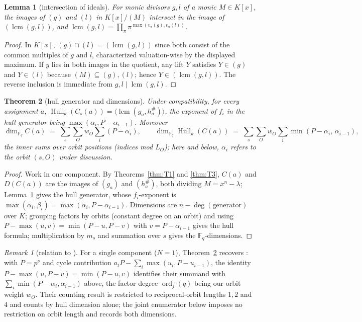 \documentclass[11pt]{article}
\newtheorem{theorem}{Theorem}[section]
\newtheorem{lemma}[theorem]{Lemma}
\theoremstyle{definition}
\theoremstyle{remark}
\newtheorem*{remark}{Remark}
\newcommand{\Fq}{\mathbb{F}_q}
\newcommand{\Hull}{\operatorname{Hull}}
\newcommand{\lcm}{\operatorname{lcm}}
\begin{document}
\begin{lemma}[intersection of ideals]\label{lem:lcm}
For monic divisors \(g, l\) of a monic \(M \in K[x]\), the images of
\((g)\) and \((l)\) in \(K[x]/(M)\) intersect in the image of
\((\lcm(g,l))\), and
\(\lcm(g,l) = \prod_{\pi} \pi^{\max(v_\pi(g), v_\pi(l))}\).
\end{lemma}

\begin{proof}
In \(K[x]\), \((g) \cap (l) = (\lcm(g,l))\) since both consist of the
common multiples of \(g\) and \(l\), characterized valuation-wise by the
displayed maximum. If \(y\) lies in both images in the quotient, any
lift \(Y\) satisfies \(Y \in (g)\) and \(Y \in (l)\) because
\((M) \subseteq (g), (l)\); hence \(Y \in (\lcm(g,l))\). The reverse
inclusion is immediate from \(g, l \mid \lcm(g,l)\).
\end{proof}

\begin{theorem}[hull generator and dimensions]\label{thm:T4}
Under compatibility, for every assignment \(a\),
\(\Hull_k(C_s(a)) = \langle \lcm(g_a, h_a^{\#}) \rangle\), the exponent
of \(f_i\) in the hull generator being \(\max(\alpha_i, P-\alpha_{i-1})\).
Moreover
\[
\dim_{\Fq} C(a) \;=\; \sum_{s} \sum_{O} w_O \sum_{i} (P - \alpha_i),
\qquad
\dim_{\Fq} \Hull_k(C(a)) \;=\; \sum_{s} \sum_{O} w_O \sum_i
\min(P-\alpha_i,\, \alpha_{i-1}),
\]
the inner sums over orbit positions (indices mod \(L_O\)); here and
below, \(\alpha_i\) refers to the orbit \((s,O)\) under discussion.
\end{theorem}

\begin{proof}
Work in one component. By Theorems~\ref{thm:T1} and \ref{thm:T3},
\(C(a)\) and \(D(C(a))\) are the images of \((g_a)\) and
\((h_a^{\#})\), both dividing \(M = x^n-\lambda\); Lemma~\ref{lem:lcm}
gives the hull generator, whose \(f_i\)-exponent is
\(\max(\alpha_i, \beta_i) = \max(\alpha_i, P-\alpha_{i-1})\). Dimensions
are \(n - \deg(\text{generator})\) over \(K\); grouping factors by
orbits (constant degree on an orbit) and using
\(P - \max(u,v) = \min(P-u, P-v)\) with \(v = P-\alpha_{i-1}\) gives the
hull formula; multiplication by \(m_s\) and summation over \(s\) gives
the \(\Fq\)-dimensions.
\end{proof}

\begin{remark}[relation to \cite{DPI2023}]
For a single component (\(N = 1\)), Theorem~\ref{thm:T4} recovers
\cite[Theorem~3]{DPI2023}: with \(P = p^{\nu}\) and cycle contribution
\(a_t P - \sum_i \max(u_i, P - u_{i-1})\), the identity
\(P - \max(u, P - v) = \min(P - u, v)\) identifies their summand with
\(\sum_i \min(P - \alpha_i, \alpha_{i-1})\) above, the factor degree
\(\operatorname{ord}_j(q)\) being our orbit weight \(w_O\). Their
counting result \cite[Theorem~4]{DPI2023} is restricted to
reciprocal-orbit lengths \(1, 2\) and \(4\) and counts by hull
dimension alone; the joint enumerator below imposes no restriction on
orbit length and records both dimensions.
\end{remark}
\end{document}
